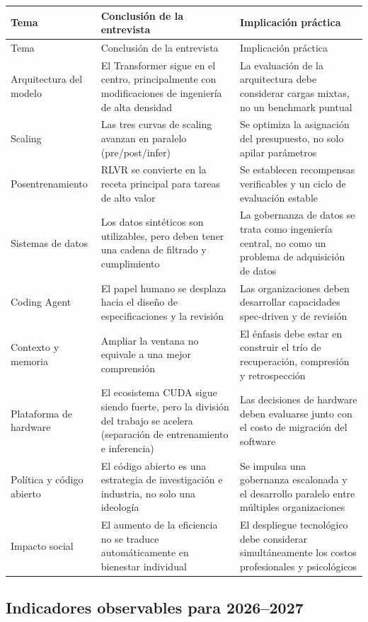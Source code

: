 \begin{longtable}{p{}p{}p{}}
\toprule
Tema & Conclusión de la entrevista & Implicación práctica \\
\midrule
\endfirsthead
\toprule
Tema & Conclusión de la entrevista & Implicación práctica \\
\midrule
\endhead
Arquitectura del modelo & El Transformer sigue en el centro, principalmente con modificaciones de ingeniería de alta densidad & La evaluación de la arquitectura debe considerar cargas mixtas, no un benchmark puntual \\
Scaling & Las tres curvas de scaling avanzan en paralelo (pre/post/infer) & Se optimiza la asignación del presupuesto, no solo apilar parámetros \\
Posentrenamiento & RLVR se convierte en la receta principal para tareas de alto valor & Se establecen recompensas verificables y un ciclo de evaluación estable \\
Sistemas de datos & Los datos sintéticos son utilizables, pero deben tener una cadena de filtrado y cumplimiento & La gobernanza de datos se trata como ingeniería central, no como un problema de adquisición de datos \\
Coding Agent & El papel humano se desplaza hacia el diseño de especificaciones y la revisión & Las organizaciones deben desarrollar capacidades spec-driven y de revisión \\
Contexto y memoria & Ampliar la ventana no equivale a una mejor comprensión & El énfasis debe estar en construir el trío de recuperación, compresión y retrospección \\
Plataforma de hardware & El ecosistema CUDA sigue siendo fuerte, pero la división del trabajo se acelera (separación de entrenamiento e inferencia) & Las decisiones de hardware deben evaluarse junto con el costo de migración del software \\
Política y código abierto & El código abierto es una estrategia de investigación e industria, no solo una ideología & Se impulsa una gobernanza escalonada y el desarrollo paralelo entre múltiples organizaciones \\
Impacto social & El aumento de la eficiencia no se traduce automáticamente en bienestar individual & El despliegue tecnológico debe considerar simultáneamente los costos profesionales y psicológicos \\
\bottomrule
\end{longtable}

\subsection{Indicadores observables para 2026--2027}

